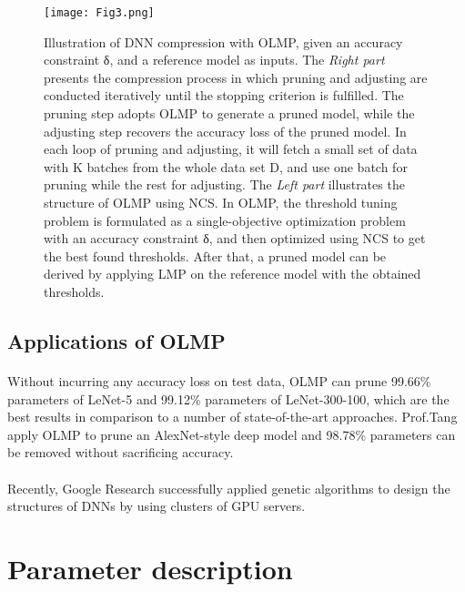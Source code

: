 \documentclass[10pt,letterpaper]{article}
\begin{document}
\begin{figure}[H]
  \centering
  \texttt{[image: Fig3.png]}\\
  \caption{Illustration of DNN compression with OLMP, given an accuracy constraint δ, and a reference model as inputs. The \emph{Right part} presents the compression process in which pruning and adjusting are conducted iteratively until the stopping criterion is fulfilled. The pruning step adopts OLMP to generate a pruned model, while the adjusting step recovers the accuracy loss of the pruned model. In each loop of pruning and adjusting, it will fetch a small set of data with K batches from the whole data set D, and use one batch for pruning while the rest for adjusting. The \emph{Left part} illustrates the structure of OLMP using NCS. In OLMP, the threshold tuning problem is formulated as a single-objective optimization problem with an accuracy constraint δ, and then optimized using NCS to get the best found thresholds. After that, a pruned model can be derived by applying LMP on the reference model with the obtained thresholds.}
  \label{straddltimeScale}
\end{figure}

\subsection{Applications of OLMP}

\paragraph{}
Without incurring any accuracy loss on test data, OLMP can prune 99.66\% parameters of LeNet-5 and 99.12\% parameters of LeNet-300-100, which are the best results in comparison to a number of state-of-the-art approaches. Prof.Tang apply OLMP to prune an AlexNet-style deep model and 98.78\% parameters can be removed without sacrificing accuracy.\cite{li2018optimization}

\paragraph{}
Recently, Google Research successfully applied genetic algorithms to design the structures of DNNs by using clusters of GPU servers.

\section{Parameter description}
\end{document}
